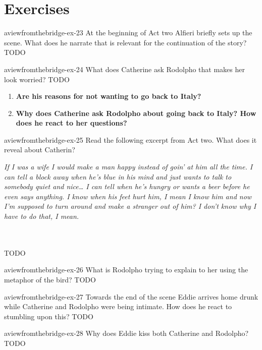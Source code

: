 \documentclass[preview]{standalone}
\begin{document}
\genpage

\section{Exercises}

\begin{snippetexercise}{aviewfromthebridge-ex-23}
    {At the beginning of Act two Alfieri briefly sets up the scene. What does he narrate that is relevant
    for the continuation of the story?}
    TODO
\end{snippetexercise}

\begin{snippetexercise}{aviewfromthebridge-ex-24}
    {What does Catherine ask Rodolpho that makes her look worried?}
    TODO

    \begin{enumerate}
        \item \textbf{Are his reasons for not wanting to go back to Italy?}
        \item \textbf{Why does Catherine ask Rodolpho about going back to Italy? How does he react to her
        questions?}
    \end{enumerate}
\end{snippetexercise}

\begin{snippetexercise}{aviewfromthebridge-ex-25}
    {Read the following excerpt from Act two. What does it reveal about Catherin?}
    \hspace{0.1\textwidth}
    \begin{minipage}[r]{0.8\textwidth}
        \itshape
        If I was a wife I would make a man happy instead of goin' at him all the time. I can tell a
        block away when he's blue in his mind and just wants to talk to somebody quiet and
        nice… I can tell when he's hungry or wants a beer before he even says anything. I know
        when his feet hurt him, I mean I know him and now I'm supposed to turn around and
        make a stranger out of him? I don't know why I have to do that, I mean.
    \end{minipage}
    \\\\
    TODO
\end{snippetexercise}

\begin{snippetexercise}{aviewfromthebridge-ex-26}
    {What is Rodolpho trying to explain to her using the metaphor of the bird?}
    TODO
\end{snippetexercise}

\begin{snippetexercise}{aviewfromthebridge-ex-27}
    {Towards the end of the scene Eddie arrives home drunk while Catherine and Rodolpho were being
    intimate. How does he react to stumbling upon this?}
    TODO
\end{snippetexercise}

\begin{snippetexercise}{aviewfromthebridge-ex-28}
    {Why does Eddie kiss both Catherine and Rodolpho?}
    TODO
\end{snippetexercise}
\end{document}
